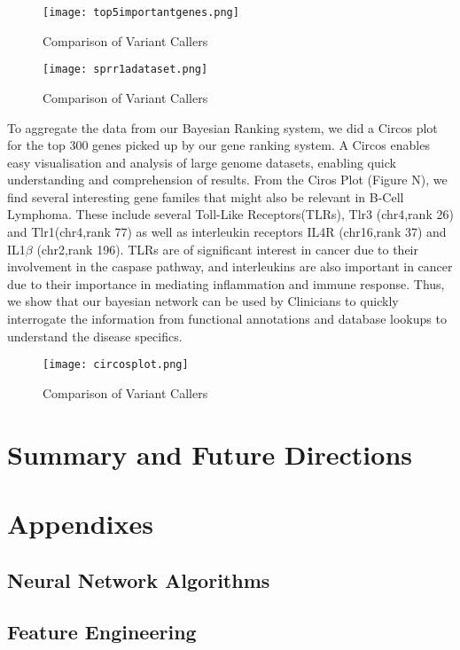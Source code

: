 \documentclass{article}
\begin{document}
\begin{figure}[H]
\texttt{[image: top5importantgenes.png]}
\caption{Comparison of Variant Callers}
\centering
\end{figure}

\begin{figure}[H]
\texttt{[image: sprr1adataset.png]}
\caption{Comparison of Variant Callers}
\centering
\end{figure}


To aggregate the data from our Bayesian Ranking system, we did a Circos plot for the top 300 genes picked up by our gene ranking system. A Circos enables easy visualisation and analysis of large genome datasets, enabling quick understanding and comprehension of results. From the Ciros Plot (Figure N), we find several interesting gene familes that might also be relevant in B-Cell Lymphoma. These include several Toll-Like Receptors(TLRs), Tlr3 (chr4,rank 26) and Tlr1(chr4,rank 77) as well as interleukin receptors IL4R (chr16,rank 37) and IL1$\beta$ (chr2,rank 196). TLRs are of significant interest in cancer due to their involvement in the caspase pathway, and interleukins are also important in cancer due to their importance in mediating inflammation and immune response. Thus, we show that our bayesian network can be used by Clinicians to quickly interrogate the information from functional annotations and database lookups to understand the disease specifics. 

\begin{figure}[H]
\texttt{[image: circosplot.png]}
\caption{Comparison of Variant Callers}
\centering
\end{figure}


\section{Summary and Future Directions}


\section{Appendixes}

\subsection{Neural Network Algorithms}

\subsection{Feature Engineering}
\end{document}
